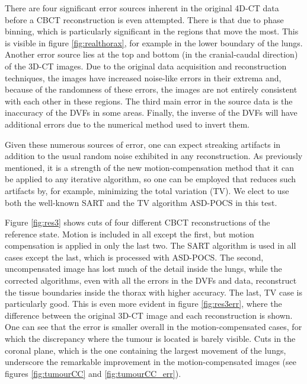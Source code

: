 There are four significant error sources inherent in the original 4D-CT data before a CBCT reconstruction is even attempted.  There is that due to phase binning, which is particularly significant in the regions that move the most.  This is visible in figure \ref{fig:realthorax}, for example in the lower boundary of the lungs.  Another error source lies at the top and bottom (in the cranial-caudal direction) of the 3D-CT images.  Due to the original data acquisition and reconstruction techniques, the images have increased noise-like errors in their extrema and, because of the randomness of these errors, the images are not entirely consistent with each other in these regions.  The third main error in the source data is the inaccuracy of the DVFs in some areas.  Finally, the inverse of the DVFs will have additional errors due to the numerical method used to invert them.

Given these numerous sources of error, one can expect streaking artifacts in addition to the usual random noise exhibited in any reconstruction.  As previously mentioned, it is a strength of the new motion-compensation method that it can be applied to any iterative algorithm, so one can be employed that reduces such artifacts by, for example, minimizing the total variation (TV).  We elect to use both the well-known SART and the TV algorithm ASD-POCS\cite{ASD_POCS} in this test.

Figure \ref{fig:res3} shows cuts of four different CBCT reconstructions of the reference state.  Motion is included in all except the first, but motion compensation is applied in only the last two.  The SART algorithm is used in all cases except the last, which is processed with ASD-POCS.  The second, uncompensated image has lost much of the detail inside the lungs, while the corrected algorithms, even with all the errors in the DVFs and data, reconstruct the tissue boundaries inside the thorax with higher accuracy.  The last, TV case is particularly good.  This is even more evident in figure \ref{fig:res3err}, where the difference between the original 3D-CT image and each reconstruction is shown.  One can see that the error is smaller overall in the motion-compensated cases, for which the discrepancy where the tumour is located is barely visible.  Cuts in the coronal plane, which is the one containing the largest movement of the lungs, underscore the remarkable improvement in the motion-compensated images (see figures \ref{fig:tumourCC} and \ref{fig:tumourCC_err}).

